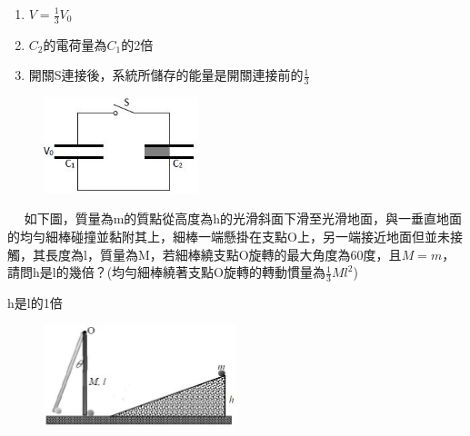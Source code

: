 \documentclass[cn,10pt,math=newtx,chinesefont=founder]{elegantbook}
\begin{document}
\begin{solution}
\begin{enumerate}[label=(\arabic*)]
\item $V=\frac{1}{3} V_0$
\item $C_2$的電荷量為$C_1$的2倍
\item 開關S連接後，系統所儲存的能量是開關連接前的$\frac{1}{3}$
\end{enumerate}
\end{solution}

\begin{figure}[htbp]
\flushright
\includegraphics[width=0.4\textwidth]{image/444.JPG}
\end{figure}

\newpage






\begin{example}　
    如下圖，質量為m的質點從高度為h的光滑斜面下滑至光滑地面，與一垂直地面的均勻細棒碰撞並黏附其上，細棒一端懸掛在支點O上，另一端接近地面但並未接觸，其長度為l，質量為M，若細棒繞支點O旋轉的最大角度為60度，且$M=m$，請問h是l的幾倍？(均勻細棒繞著支點O旋轉的轉動慣量為$\frac{1}{3} Ml^2$)
    
    \rightline{[1]}
\end{example}

\begin{solution}
h是l的1倍
\end{solution}

\begin{figure}[htbp]
\flushright
\includegraphics[width=0.5\textwidth]{image/1111.JPG}
\end{figure}
\end{document}
